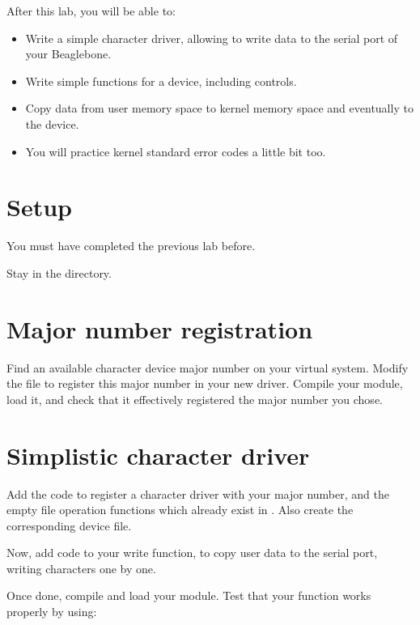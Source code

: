 
After this lab, you will be able to:

\begin{itemize}
\item Write a simple character driver, allowing to write data to the
  serial port of your Beaglebone.
\item Write simple  functions for a device,
  including  controls.
\item Copy data from user memory space to kernel memory space and
  eventually to the device.
\item You will practice kernel standard error codes a little bit too.
\end{itemize}

\section{Setup}

You must have completed the previous lab before.

Stay in the  directory.

\section{Major number registration}

Find an available character device major number on your virtual
system. Modify the  file to register this major number
in your new driver. Compile your module, load it, and check that it
effectively registered the major number you chose.

\section{Simplistic character driver}

Add the code to register a character driver with your major number, and
the empty file operation functions which already exist in
. Also create the corresponding  device file.

Now, add code to your write function, to copy user data to the serial
port, writing characters one by one.

Once done, compile and load your module. Test that your  function
works properly by using:

